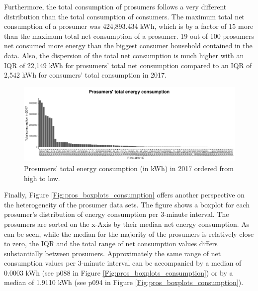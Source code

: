Furthermore, the total consumption of prosumers follows a very different distribution than the total consumption of consumers. The maximum total net consumption of a prosumer was 424,893.434 kWh, which is by a factor of 15 more than the maximum total net consumption of a prosumer. 19 out of 100 prosumers net consumed more energy than the biggest consumer household contained in the data. Also, the dispersion of the total net consumption is much higher with an IQR of 22,149 kWh for prosumers' total net consumption compared to an IQR of 2,542 kWh for consumers' total consumption in 2017.

\begin{figure}[htbp]
 \centering
\includegraphics[width=\textwidth]{thesis/graphs/prosumer_totalconsumption2.pdf}
\caption[Prosumers’ total energy consumption (in kWh) in 2017]{Prosumers’ total energy consumption (in kWh) in 2017 ordered from high to low. \quantnet}
\label{Fig:pros_total_consumption}
\end{figure}

Finally, Figure \ref{Fig:pros_boxplots_consumption} offers another perspective on the heterogeneity of the prosumer data sets. The figure shows a boxplot for each prosumer's distribution of energy consumption per 3-minute interval. The prosumers are sorted on the x-Axis by their median net energy consumption. As can be seen, while the median for the majority of the prosumers is relatively close to zero, the IQR and the total range of net consumption values differs substantially between prosumers. Approximately the same range of net consumption values per 3-minute interval can be accompanied by a median of 0.0003 kWh (see p088 in Figure \ref{Fig:pros_boxplots_consumption}) or by a median of 1.9110 kWh (see p094 in Figure \ref{Fig:pros_boxplots_consumption}).

